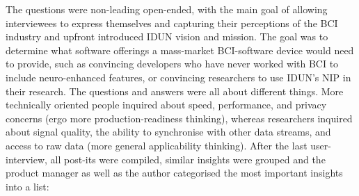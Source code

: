 The questions were non-leading open-ended, with the main goal of allowing interviewees to express themselves and capturing their perceptions of the BCI industry and upfront introduced IDUN vision and mission. The goal was to determine what software offerings a mass-market BCI-software device would need to provide, such as convincing developers who have never worked with BCI to include neuro-enhanced features, or convincing researchers to use IDUN's NIP in their research. The questions and answers were all about different things. More technically oriented people inquired about speed, performance, and privacy concerns (ergo more production-readiness thinking), whereas researchers inquired about signal quality, the ability to synchronise with other data streams, and access to raw data (more general applicability thinking). After the last user-interview, all post-its were compiled, similar insights were grouped and the product manager as well as the author categorised the most important insights into a list:

